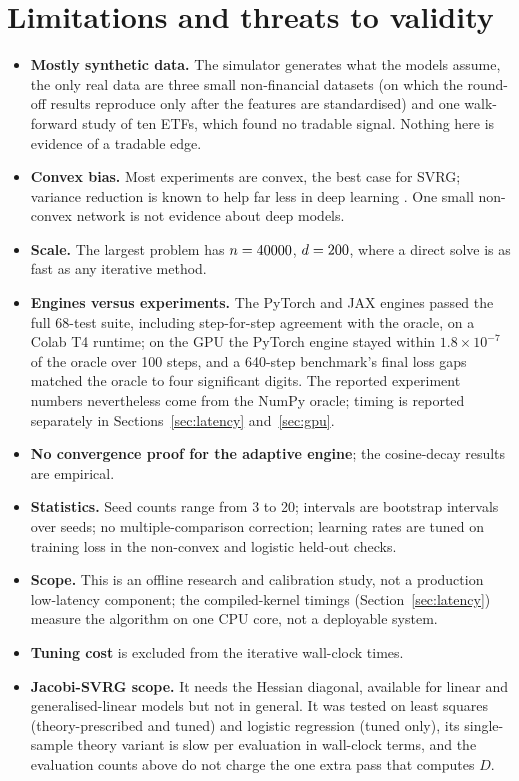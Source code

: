 \documentclass[11pt]{article}
\theoremstyle{remark}
\begin{document}
\section{Limitations and threats to validity}
\begin{itemize}[leftmargin=*,itemsep=2pt]
\item \textbf{Mostly synthetic data.} The simulator generates what the models assume, the only real data are three small non-financial datasets (on which the round-off results reproduce only after the features are standardised) and one walk-forward study of ten ETFs, which found no tradable signal. Nothing here is evidence of a tradable edge.
\item \textbf{Convex bias.} Most experiments are convex, the best case for SVRG; variance reduction is known to help far less in deep learning \cite{defazio2019}. One small non-convex network is not evidence about deep models.
\item \textbf{Scale.} The largest problem has $n=40000$, $d=200$, where a direct solve is as fast as any iterative method.
\item \textbf{Engines versus experiments.} The PyTorch and JAX engines passed the full 68-test suite, including step-for-step agreement with the oracle, on a Colab T4 runtime; on the GPU the PyTorch engine stayed within $1.8\times10^{-7}$ of the oracle over 100 steps, and a 640-step benchmark's final loss gaps matched the oracle to four significant digits. The reported experiment numbers nevertheless come from the NumPy oracle; timing is reported separately in Sections~\ref{sec:latency} and~\ref{sec:gpu}.
\item \textbf{No convergence proof for the adaptive engine}; the cosine-decay results are empirical.
\item \textbf{Statistics.} Seed counts range from 3 to 20; intervals are bootstrap intervals over seeds; no multiple-comparison correction; learning rates are tuned on training loss in the non-convex and logistic held-out checks.
\item \textbf{Scope.} This is an offline research and calibration study, not a production low-latency component; the compiled-kernel timings (Section~\ref{sec:latency}) measure the algorithm on one CPU core, not a deployable system.
\item \textbf{Tuning cost} is excluded from the iterative wall-clock times.
\item \textbf{Jacobi-SVRG scope.} It needs the Hessian diagonal, available for linear and generalised-linear models but not in general. It was tested on least squares (theory-prescribed and tuned) and logistic regression (tuned only), its single-sample theory variant is slow per evaluation in wall-clock terms, and the evaluation counts above do not charge the one extra pass that computes $D$.
\end{itemize}
\end{document}
